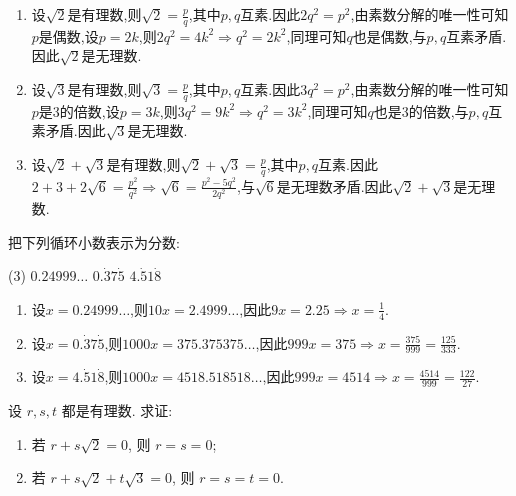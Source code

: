 \begin{solution}
    \begin{enumerate}[(1)]
        \item 设$\sqrt{2}$是有理数,则$\sqrt{2} = \frac{p}{q}$,其中$p,q$互素.因此$2q^2 = p^2$,由素数分解的唯一性可知$p$是偶数,设$p=2k$,则$2q^2 = 4k^2 \Rightarrow q^2 = 2k^2$,同理可知$q$也是偶数,与$p,q$互素矛盾.因此$\sqrt{2}$是无理数.
        \item 设$\sqrt{3}$是有理数,则$\sqrt{3} = \frac{p}{q}$,其中$p,q$互素.因此$3q^2 = p^2$,由素数分解的唯一性可知$p$是3的倍数,设$p=3k$,则$3q^2 = 9k^2 \Rightarrow q^2 = 3k^2$,同理可知$q$也是3的倍数,与$p,q$互素矛盾.因此$\sqrt{3}$是无理数.
        \item 设$\sqrt{2} + \sqrt{3}$是有理数,则$\sqrt{2} + \sqrt{3} = \frac{p}{q}$,其中$p,q$互素.因此$2 + 3 + 2\sqrt{6} = \frac{p^2}{q^2} \Rightarrow \sqrt{6} = \frac{p^2 - 5q^2}{2q^2}$,与$\sqrt{6}$是无理数矛盾.因此$\sqrt{2} + \sqrt{3}$是无理数.
    \end{enumerate}
\end{solution}

\begin{exercise}[1.1.4]
    把下列循环小数表示为分数:
    \begin{tasks}[label=(\arabic*)](3)
        \task $0.24999\dots$
        \task $0.\dot{3}7\dot{5}$
        \task $4.\dot{5}1\dot{8}$
    \end{tasks}
\end{exercise}

\begin{solution}
    \begin{enumerate}[(1)]
        \item 设$x = 0.24999\dots$,则$10x = 2.4999\dots$,因此$9x = 2.25 \Rightarrow x = \frac{1}{4}$.
        \item 设$x = 0.\dot{3}7\dot{5}$,则$1000x = 375.375375\dots$,因此$999x = 375 \Rightarrow x = \frac{375}{999}=\frac{125}{333}$.
        \item 设$x = 4.\dot{5}1\dot{8}$,则$1000x = 4518.518518\dots$,因此$999x = 4514 \Rightarrow x = \frac{4514}{999}=\frac{122}{27}$.
    \end{enumerate}
\end{solution}

\begin{exercise}[1.1.5]
    设 $r,s,t$ 都是有理数. 求证:
    \begin{enumerate}
        \item 若 $r+s\sqrt{2}=0$, 则 $r=s=0$;
        \item 若 $r+s\sqrt{2}+t\sqrt{3}=0$, 则 $r=s=t=0$.
    \end{enumerate}
\end{exercise}

